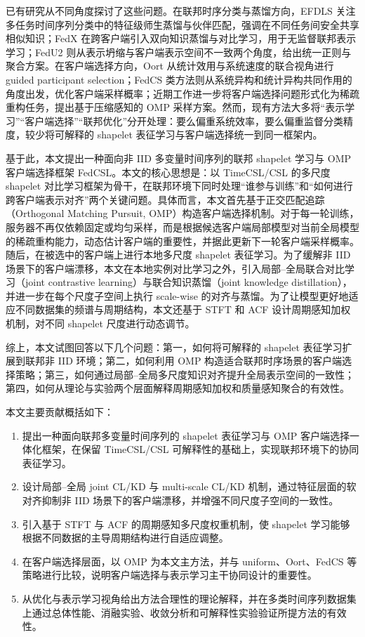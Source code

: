 \documentclass{article}
\begin{document}
已有研究从不同角度探讨了这些问题。在联邦时序分类与蒸馏方向，EFDLS 关注多任务时间序列分类中的特征级师生蒸馏与伙伴匹配，强调在不同任务间安全共享相似知识\cite{efdls}；FedX 在跨客户端引入双向知识蒸馏与对比学习，用于无监督联邦表示学习\cite{fedx}；FedU2 则从表示坍缩与客户端表示空间不一致两个角度，给出统一正则与聚合方案\cite{fedu2}。在客户端选择方向，Oort 从统计效用与系统速度的联合视角进行 guided participant selection\cite{oort}；FedCS 类方法则从系统异构和统计异构共同作用的角度出发，优化客户端采样概率\cite{fedcsadaptive}；近期工作进一步将客户端选择问题形式化为稀疏重构任务，提出基于压缩感知的 OMP 采样方案\cite{secompfl}。然而，现有方法大多将“表示学习”“客户端选择”“联邦优化”分开处理：要么偏重系统效率，要么偏重监督分类精度，较少将可解释的 shapelet 表征学习与客户端选择统一到同一框架内。

基于此，本文提出一种面向非 IID 多变量时间序列的联邦 shapelet 学习与 OMP 客户端选择框架 FedCSL。本文的核心思想是：以 TimeCSL/CSL 的多尺度 shapelet 对比学习框架为骨干，在联邦环境下同时处理“谁参与训练”和“如何进行跨客户端表示对齐”两个关键问题。具体而言，本文首先基于正交匹配追踪（Orthogonal Matching Pursuit, OMP）构造客户端选择机制。对于每一轮训练，服务器不再仅依赖固定或均匀采样，而是根据候选客户端局部模型对当前全局模型的稀疏重构能力，动态估计客户端的重要性，并据此更新下一轮客户端采样概率。随后，在被选中的客户端上进行本地多尺度 shapelet 表征学习。为了缓解非 IID 场景下的客户端漂移，本文在本地实例对比学习之外，引入局部--全局联合对比学习（joint contrastive learning）与联合知识蒸馏（joint knowledge distillation），并进一步在每个尺度子空间上执行 scale-wise 的对齐与蒸馏。为了让模型更好地适应不同数据集的频谱与周期结构，本文还基于 STFT 和 ACF 设计周期感知加权机制，对不同 shapelet 尺度进行动态调节。

综上，本文试图回答以下几个问题：第一，如何将可解释的 shapelet 表征学习扩展到联邦非 IID 环境；第二，如何利用 OMP 构造适合联邦时序场景的客户端选择策略；第三，如何通过局部--全局多尺度知识对齐提升全局表示空间的一致性；第四，如何从理论与实验两个层面解释周期感知加权和质量感知聚合的有效性。

本文主要贡献概括如下：
\begin{enumerate}[leftmargin=2.5em]
    \item 提出一种面向联邦多变量时间序列的 shapelet 表征学习与 OMP 客户端选择一体化框架，在保留 TimeCSL/CSL 可解释性的基础上，实现联邦环境下的协同表征学习。
    \item 设计局部--全局 joint CL/KD 与 multi-scale CL/KD 机制，通过特征层面的软对齐抑制非 IID 场景下的客户端漂移，并增强不同尺度子空间的一致性。
    \item 引入基于 STFT 与 ACF 的周期感知多尺度权重机制，使 shapelet 学习能够根据不同数据的主导周期结构进行自适应调整。
    \item 在客户端选择层面，以 OMP 为本文主方法，并与 uniform、Oort、FedCS 等策略进行比较，说明客户端选择与表示学习主干协同设计的重要性。
    \item 从优化与表示学习视角给出方法合理性的理论解释，并在多类时间序列数据集上通过总体性能、消融实验、收敛分析和可解释性实验验证所提方法的有效性。
\end{enumerate}
\end{document}
